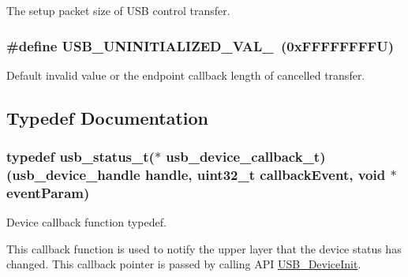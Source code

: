 The setup packet size of U\-S\-B control transfer. 

\hypertarget{group__usb__device__driver_ga89fb39ed32e04cdb444d6d06831f1d48}{
\subsubsection[{U\-S\-B\-\_\-\-U\-N\-I\-N\-I\-T\-I\-A\-L\-I\-Z\-E\-D\-\_\-\-V\-A\-L\-\_\-32}]{\setlength{\rightskip}{0pt plus 5cm}\#define U\-S\-B\-\_\-\-U\-N\-I\-N\-I\-T\-I\-A\-L\-I\-Z\-E\-D\-\_\-\-V\-A\-L\-\_~(0x\-F\-F\-F\-F\-F\-F\-F\-F\-U)}}\label{group__usb__device__driver_ga89fb39ed32e04cdb444d6d06831f1d48}


Default invalid value or the endpoint callback length of cancelled transfer. 



\subsection{Typedef Documentation}
\hypertarget{group__usb__device__driver_gac8ba48f1dea2c0b099092576ad48fb4e}{
\subsubsection[{usb\-\_\-device\-\_\-callback\-\_\-t}]{\setlength{\rightskip}{0pt plus 5cm}typedef {\bf usb\-\_\-status\-\_\-t}($\ast$ usb\-\_\-device\-\_\-callback\-\_\-t)({\bf usb\-\_\-device\-\_\-handle} handle, uint32\-\_\-t callback\-Event, void $\ast$event\-Param)}}\label{group__usb__device__driver_gac8ba48f1dea2c0b099092576ad48fb4e}


Device callback function typedef. 

This callback function is used to notify the upper layer that the device status has changed. This callback pointer is passed by calling A\-P\-I \hyperlink{group__usb__device__driver_ga8fc2eafa1142f904576bbd697d785184}{U\-S\-B\-\_\-\-Device\-Init}.


